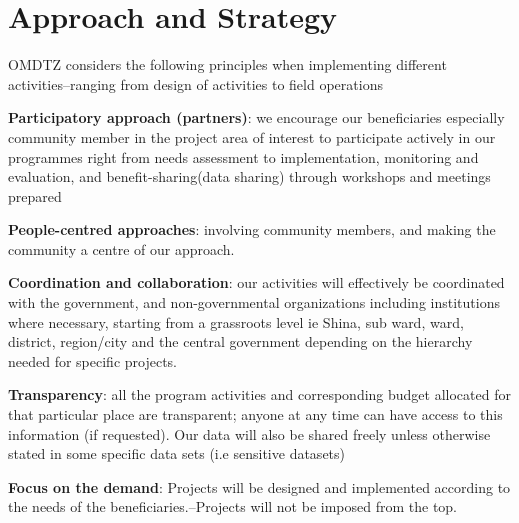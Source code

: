 \documentclass[a4paper,12pt,twoside]{article}
\begin{document}
\newpage
\section{Approach and Strategy}

OMDTZ considers the following principles when implementing different activities--ranging from design of activities to field operations

\textbf{Participatory approach (partners)}: we encourage our beneficiaries especially community member in the project area of interest to participate actively in our programmes right from needs assessment to implementation, monitoring and evaluation, and benefit-sharing(data sharing) through workshops and meetings prepared

\textbf{People-centred approaches}: involving community members, and making the community a centre of our approach.

\textbf{Coordination and collaboration}: our activities will effectively be coordinated with the government, and non-governmental organizations including institutions where necessary, starting from a grassroots level ie Shina, sub ward, ward, district, region/city and the central government depending on the hierarchy needed for specific projects.

\textbf{Transparency}: all the program activities and corresponding budget allocated for that particular place are transparent; anyone at any time can have access to this information (if requested). Our data will also be shared freely unless otherwise stated in some specific data sets (i.e sensitive datasets)

\textbf{Focus on the demand}: Projects will be designed and implemented according to the needs of the beneficiaries.--Projects will not be imposed from the top.

\newpage
\end{document}
